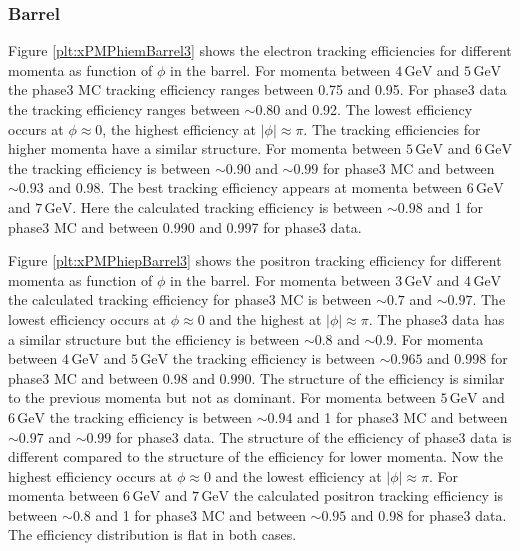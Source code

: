 \documentclass[a4paper,11pt,twosided,final,german,openbib,pdftex,listof=totoc,bibliography=totoc]{scrbook}
\begin{document}
\newpage
\subsubsection{Barrel}

Figure \ref{plt:xPMPhiemBarrel3} shows the electron tracking efficiencies for different momenta as function of $\phi$ in the barrel.
For momenta between $4\,\textrm{GeV}$ and $5\,\textrm{GeV}$ the phase3 MC tracking efficiency ranges between 0.75 and 0.95. For phase3 data the tracking efficiency ranges between $ \sim 0.80$ and 0.92. The lowest efficiency occurs at $\phi \approx 0$, the highest efficiency at $|\phi| \approx \pi$.
The tracking efficiencies for higher momenta have a similar structure. 
For momenta between $5\,\textrm{GeV}$ and $6\,\textrm{GeV}$ the tracking efficiency is between $\sim 0.90$ and $\sim 0.99$ for phase3 MC and between $\sim 0.93$ and 0.98. The best tracking efficiency appears at momenta between $6\,\textrm{GeV}$ and $7\,\textrm{GeV}$. Here the calculated tracking efficiency is between $\sim 0.98$ and 1 for phase3 MC and between 0.990 and 0.997 for phase3 data.

Figure \ref{plt:xPMPhiepBarrel3} shows the positron tracking efficiency for different momenta as function of $\phi$ in the barrel. 
For momenta between $3\,\textrm{GeV}$ and $4\,\textrm{GeV}$ the calculated tracking efficiency for phase3 MC is between $\sim 0.7$ and $\sim 0.97$. The lowest efficiency  occurs at $\phi \approx 0$ and the highest at $|\phi| \approx \pi$. The phase3 data has a similar structure but the efficiency is between $\sim 0.8$ and $\sim 0.9$.
For momenta between $4\,\textrm{GeV}$ and $5\,\textrm{GeV}$ the tracking efficiency is between $\sim 0.965$ and 0.998 for phase3 MC and between 0.98 and 0.990. The structure of the efficiency is similar to the previous momenta but not as dominant.
For momenta between $5\,\textrm{GeV}$ and $6\,\textrm{GeV}$ the tracking efficiency is between $\sim 0.94$ and 1 for phase3 MC and between $\sim 0.97$ and $\sim 0.99$ for phase3 data. The structure of the efficiency of phase3 data is different compared to the structure of the efficiency for lower momenta. Now the highest efficiency occurs at $\phi \approx 0$ and the lowest efficiency at $|\phi| \approx \pi$.
For momenta between $6\,\textrm{GeV}$ and $7\,\textrm{GeV}$ the calculated positron tracking efficiency is  between $\sim 0.8$ and 1 for phase3 MC and between $\sim 0.95$ and 0.98 for phase3 data. The efficiency distribution is flat in both cases.
\end{document}
